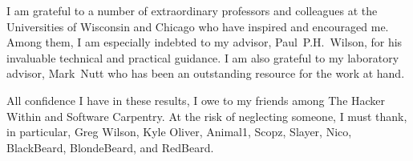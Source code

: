 I am grateful to a number of extraordinary professors and colleagues at the 
Universities of Wisconsin and Chicago who have inspired and encouraged me. Among  
them, I am especially indebted to my advisor, Paul~P.H.~Wilson, for his invaluable 
technical and practical guidance. I am also grateful to my laboratory advisor, 
Mark~Nutt who has been an outstanding resource for the work at hand.

All confidence I have in these results, I owe to my friends among The Hacker 
Within and Software Carpentry. At the risk of neglecting someone, I must thank, 
in particular, Greg Wilson, Kyle Oliver, Animal1, Scopz, Slayer, Nico, 
BlackBeard, BlondeBeard, and RedBeard.  


